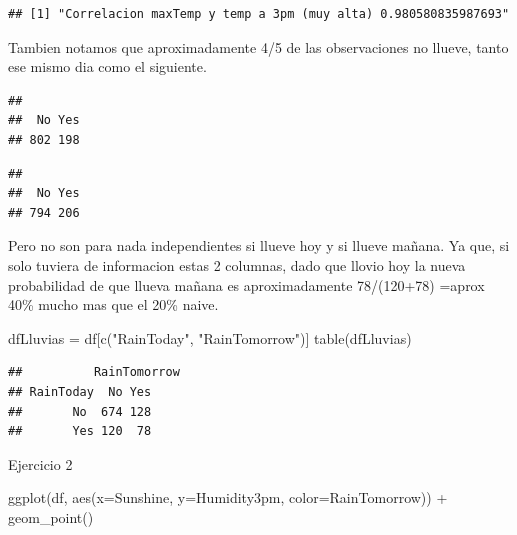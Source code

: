 \documentclass[
]{article}
\newenvironment{Shaded}{\begin{snugshade}}{\end{snugshade}}
\newcommand{\AttributeTok}[1]{\textcolor[rgb]{0.77,0.63,0.00}{#1}}
\newcommand{\FunctionTok}[1]{\textcolor[rgb]{0.00,0.00,0.00}{#1}}
\newcommand{\NormalTok}[1]{#1}
\newcommand{\OtherTok}[1]{\textcolor[rgb]{0.56,0.35,0.01}{#1}}
\newcommand{\SpecialCharTok}[1]{\textcolor[rgb]{0.00,0.00,0.00}{#1}}
\newcommand{\StringTok}[1]{\textcolor[rgb]{0.31,0.60,0.02}{#1}}
\begin{document}
\begin{verbatim}
## [1] "Correlacion maxTemp y temp a 3pm (muy alta) 0.980580835987693"
\end{verbatim}

Tambien notamos que aproximadamente 4/5 de las observaciones no llueve,
tanto ese mismo dia como el siguiente.

\begin{Shaded}
\end{Shaded}

\begin{verbatim}
## 
##  No Yes 
## 802 198
\end{verbatim}

\begin{Shaded}
\end{Shaded}

\begin{verbatim}
## 
##  No Yes 
## 794 206
\end{verbatim}

Pero no son para nada independientes si llueve hoy y si llueve mañana.
Ya que, si solo tuviera de informacion estas 2 columnas, dado que llovio
hoy la nueva probabilidad de que llueva mañana es aproximadamente
78/(120+78) =aprox 40\% mucho mas que el 20\% naive.

\begin{Shaded}
\begin{Highlighting}[]
\NormalTok{dfLluvias }\OtherTok{=}\NormalTok{ df[}\FunctionTok{c}\NormalTok{(}\StringTok{"RainToday"}\NormalTok{, }\StringTok{"RainTomorrow"}\NormalTok{)]}
\FunctionTok{table}\NormalTok{(dfLluvias)}
\end{Highlighting}
\end{Shaded}

\begin{verbatim}
##          RainTomorrow
## RainToday  No Yes
##       No  674 128
##       Yes 120  78
\end{verbatim}

Ejercicio 2

\begin{Shaded}
\begin{Highlighting}[]
\FunctionTok{ggplot}\NormalTok{(df, }\FunctionTok{aes}\NormalTok{(}\AttributeTok{x=}\NormalTok{Sunshine, }\AttributeTok{y=}\NormalTok{Humidity3pm, }\AttributeTok{color=}\NormalTok{RainTomorrow)) }\SpecialCharTok{+}
  \FunctionTok{geom\_point}\NormalTok{() }
\end{Highlighting}
\end{Shaded}
\end{document}
